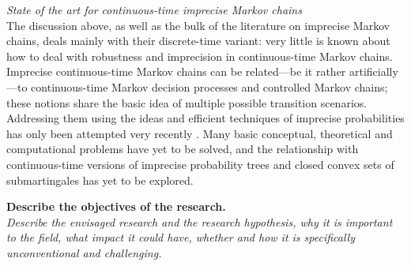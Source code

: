 \documentclass[11pt,dvipsnames,usenames,a4paper]{article}
\begin{document}
\emph{State of the art for continuous-time imprecise Markov chains}\\[5pt]
The discussion above, as well as the bulk of the literature on imprecise Markov chains, deals mainly with their discrete-time variant: very little is known about how to deal with robustness and imprecision in continuous-time Markov chains. 
Imprecise continuous-time Markov chains can be related---be it rather artificially---to continuous-time Markov decision processes and controlled Markov chains; these notions share the basic idea of multiple possible transition scenarios.
Addressing them using the ideas and efficient techniques of imprecise probabilities has only been attempted very recently \cite{skulj2015,Troffaes+GSB-ISIPTA15p,DeBock:2016:iCTMClimit,rottondi2017:flexigrid,erreygers2017:ictmcs}.
Many basic conceptual, theoretical and computational problems have yet to be solved, and the relationship with continuous-time versions of imprecise probability trees and closed convex sets of submartingales has yet to be explored.



\vspace{3mm}

\textbf{Describe the objectives of the research.}\\
\textit{Describe the envisaged research and the research hypothesis, why it is important to the field, what impact it could have, whether and how it is specifically unconventional and challenging.}
\end{document}
